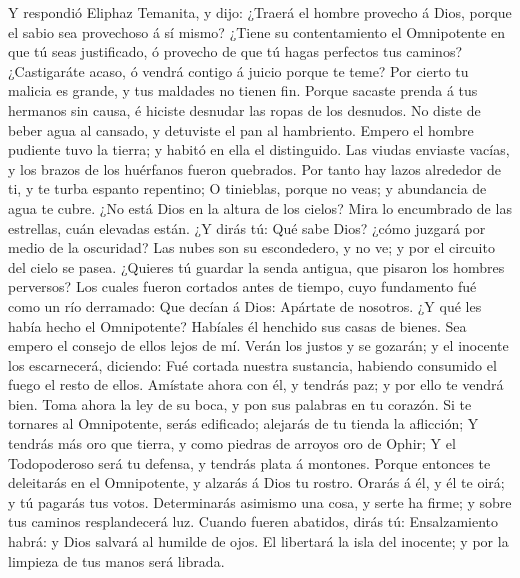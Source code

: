  Y respondió Eliphaz Temanita, y dijo: 
¿Traerá el hombre provecho á Dios, porque el sabio sea provechoso á sí
mismo?  ¿Tiene su contentamiento el Omnipotente en que tú
seas justificado, ó provecho de que tú hagas perfectos tus caminos?
 ¿Castigaráte acaso, ó vendrá contigo á juicio porque te
teme?  Por cierto tu malicia es grande, y tus maldades no
tienen fin.  Porque sacaste prenda á tus hermanos sin
causa, é hiciste desnudar las ropas de los desnudos.  No
diste de beber agua al cansado, y detuviste el pan al hambriento.
 Empero el hombre pudiente tuvo la tierra; y habitó en
ella el distinguido.  Las viudas enviaste vacías, y los
brazos de los huérfanos fueron quebrados.  Por tanto hay
lazos alrededor de ti, y te turba espanto repentino;  O
tinieblas, porque no veas; y abundancia de agua te cubre.
 ¿No está Dios en la altura de los cielos? Mira lo
encumbrado de las estrellas, cuán elevadas están.  ¿Y
dirás tú: Qué sabe Dios? ¿cómo juzgará por medio de la oscuridad?
 Las nubes son su escondedero, y no ve; y por el circuito
del cielo se pasea.  ¿Quieres tú guardar la senda
antigua, que pisaron los hombres perversos?  Los cuales
fueron cortados antes de tiempo, cuyo fundamento fué como un río
derramado:  Que decían á Dios: Apártate de nosotros. ¿Y
qué les había hecho el Omnipotente?  Habíales él henchido
sus casas de bienes. Sea empero el consejo de ellos lejos de mí.
 Verán los justos y se gozarán; y el inocente los
escarnecerá, diciendo:  Fué cortada nuestra sustancia,
habiendo consumido el fuego el resto de ellos.  Amístate
ahora con él, y tendrás paz; y por ello te vendrá bien. 
Toma ahora la ley de su boca, y pon sus palabras en tu corazón.
 Si te tornares al Omnipotente, serás edificado; alejarás
de tu tienda la aflicción;  Y tendrás más oro que tierra,
y como piedras de arroyos oro de Ophir;  Y el
Todopoderoso será tu defensa, y tendrás plata á montones.
 Porque entonces te deleitarás en el Omnipotente, y
alzarás á Dios tu rostro.  Orarás á él, y él te oirá; y
tú pagarás tus votos.  Determinarás asimismo una cosa, y
serte ha firme; y sobre tus caminos resplandecerá luz. 
Cuando fueren abatidos, dirás tú: Ensalzamiento habrá: y Dios salvará al
humilde de ojos.  El libertará la isla del inocente; y
por la limpieza de tus manos será librada.

